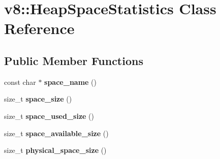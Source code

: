 \hypertarget{classv8_1_1_heap_space_statistics}{}\section{v8\+:\+:Heap\+Space\+Statistics Class Reference}
\label{classv8_1_1_heap_space_statistics}
\subsection*{Public Member Functions}
\begin{DoxyCompactItemize}
\item 
const char $\ast$ {\bfseries space\+\_\+name} ()\hypertarget{classv8_1_1_heap_space_statistics_a2114590101f48ff47f3ef25397f004a1}{}\label{classv8_1_1_heap_space_statistics_a2114590101f48ff47f3ef25397f004a1}

\item 
size\+\_\+t {\bfseries space\+\_\+size} ()\hypertarget{classv8_1_1_heap_space_statistics_aee3e8b2bad0716d45d0463ce5d0f23de}{}\label{classv8_1_1_heap_space_statistics_aee3e8b2bad0716d45d0463ce5d0f23de}

\item 
size\+\_\+t {\bfseries space\+\_\+used\+\_\+size} ()\hypertarget{classv8_1_1_heap_space_statistics_ad7bbdfe5c8991e6e1b2da6d9d6a1a66b}{}\label{classv8_1_1_heap_space_statistics_ad7bbdfe5c8991e6e1b2da6d9d6a1a66b}

\item 
size\+\_\+t {\bfseries space\+\_\+available\+\_\+size} ()\hypertarget{classv8_1_1_heap_space_statistics_af700564f349f6f2fee72de97bd69c294}{}\label{classv8_1_1_heap_space_statistics_af700564f349f6f2fee72de97bd69c294}

\item 
size\+\_\+t {\bfseries physical\+\_\+space\+\_\+size} ()\hypertarget{classv8_1_1_heap_space_statistics_a2ca295068884d9ea0162ad0a0391fc22}{}\label{classv8_1_1_heap_space_statistics_a2ca295068884d9ea0162ad0a0391fc22}

\end{DoxyCompactItemize}
